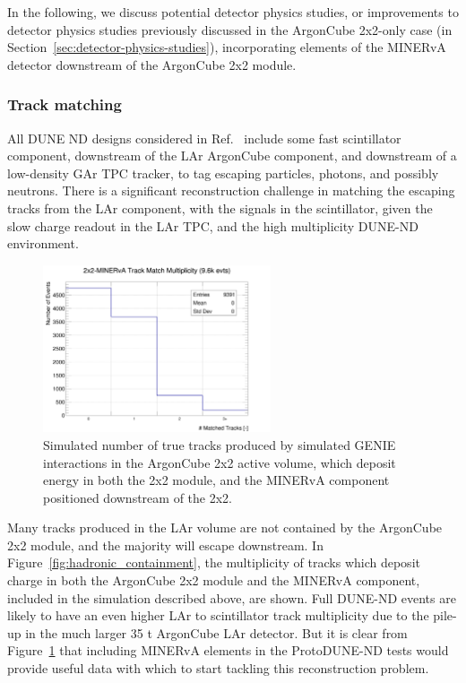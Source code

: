 In the following, we discuss potential detector physics studies, or improvements to detector physics studies previously discussed in the ArgonCube 2x2-only case (in Section~\ref{sec:detector-physics-studies}), incorporating elements of the MINERvA detector downstream of the ArgonCube 2x2 module.

\subsubsection{Track matching}
All DUNE ND designs considered in Ref.~\cite{dune_ndcsg} include some fast scintillator component, downstream of the LAr ArgonCube component, and downstream of a low-density GAr TPC tracker, to tag escaping particles, photons, and possibly neutrons. There is a significant reconstruction challenge in matching the escaping tracks from the LAr component, with the signals in the scintillator, given the slow charge readout in the LAr TPC, and the high multiplicity DUNE-ND environment.

\begin{figure}[htb]
  \centering
  \includegraphics[width=0.6\textwidth]{plots/2x2_minerva_plots/track_mathch_multiplicity.png}
  \caption{Simulated number of true tracks produced by simulated GENIE interactions in the ArgonCube 2x2 active volume, which deposit energy in both the 2x2 module, and the MINERvA component positioned downstream of the 2x2.}
  \label{fig:track_multiplicity_min}
\end{figure}
Many tracks produced in the LAr volume are not contained by the ArgonCube 2x2 module, and the majority will escape downstream. In Figure~\ref{fig:hadronic_containment}, the multiplicity of tracks which deposit charge in both the ArgonCube 2x2 module and the MINERvA component, included in the simulation described above, are shown. Full DUNE-ND events are likely to have an even higher LAr to scintillator track multiplicity due to the pile-up in the much larger 35 t ArgonCube LAr detector. But it is clear from Figure~\ref{fig:track_multiplicity_min} that including MINERvA elements in the ProtoDUNE-ND tests would provide useful data with which to start tackling this reconstruction problem.

